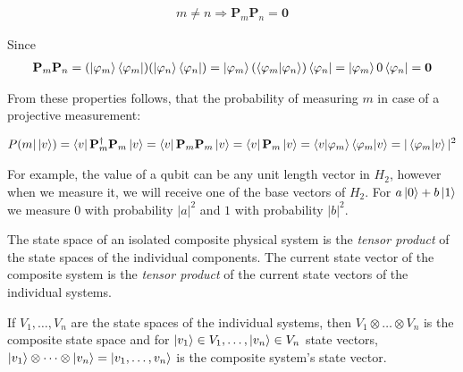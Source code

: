 \begin{property}

\begin{align*}
m \neq n \Rightarrow \mathbf{P}_m\mathbf{P}_n = \mathbf{0}
\end{align*}

Since
\begin{align*}
\mathbf{P}_m\mathbf{P}_n =
(\ket{\varphi_m}\bra{\varphi_m})(\ket{\varphi_n}\bra{\varphi_n}) =
\ket{\varphi_m}(\bra{\varphi_m}\ket{\varphi_n})\bra{\varphi_n} =
\ket{\varphi_m}0\bra{\varphi_n} =
\mathbf{0}
\end{align*}

\end{property}

From these properties follows, that the probability of measuring $m$ in case of a projective measurement:

\begin{align*}
P(m | \ket{v}) =
\bra{v}\mathbf{P}_m^{\dagger}\mathbf{P}_m \ket{v} =
\bra{v}\mathbf{P}_m\mathbf{P}_m\ket{v} = 
\bra{v}\mathbf{P}_m\ket{v} =
\bra{v}\ket{\varphi_m}\bra{\varphi_m}\ket{v} = |\bra{\varphi_m}\ket{v}|^2
\end{align*}

For example, the value of a qubit can be any unit length vector in $H_2$, however when we measure it, we will receive one
of the base vectors of $H_2$. For $a\ket{0} + b\ket{1}$ we measure $0$ with probability $|a|^2$ and $1$ with probability $|b|^2$.

\label{PostulateIV}

The state space of an isolated composite physical system is the \textit{tensor product} of the state spaces of the individual components. The current state vector of the composite system is the \textit{tensor product} of the current state vectors of the individual systems.

If $V_1,\dots,V_n$ are the state spaces of the individual systems, then $V_1 \otimes \dots \otimes V_n$ is the composite state space and for $\ket{v_1} \in V_1, \dots, \ket{v_n} \in V_n$ state vectors, $\ket{v_1} \otimes \dots \otimes \ket{v_n} = \ket{v_1,\dots,v_n}$ is the composite system's state vector.

